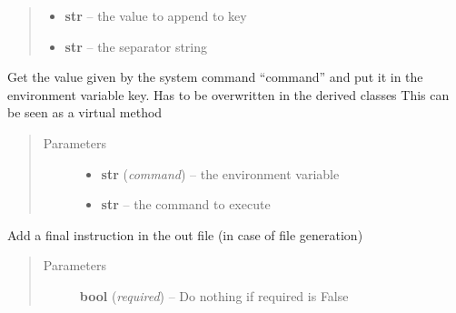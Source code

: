 \documentclass[a4paper,10pt,english]{sphinxmanual}
\begin{document}
\begin{fulllineitems}
\begin{fulllineitems}
\begin{quote}
\begin{description}
\begin{itemize}
\item {} 
\textbf{str} -- the value to append to key

\item {} 
\textbf{str} -- the separator string

\end{itemize}

\end{description}\end{quote}

\end{fulllineitems}


\begin{fulllineitems}
\label{commands/apidoc/src:src.fileEnviron.ContextFileEnviron.command_value}
Get the value given by the system command ``command'' 
and put it in the environment variable key.
Has to be overwritten in the derived classes
This can be seen as a virtual method
\begin{quote}\begin{description}
\item[{Parameters}] \leavevmode\begin{itemize}
\item {} 
\textbf{str} (\emph{command}) -- the environment variable

\item {} 
\textbf{str} -- the command to execute

\end{itemize}

\end{description}\end{quote}

\end{fulllineitems}


\begin{fulllineitems}
\label{commands/apidoc/src:src.fileEnviron.ContextFileEnviron.finish}
Add a final instruction in the out file (in case of file generation)
\begin{quote}\begin{description}
\item[{Parameters}] \leavevmode
\textbf{bool} (\emph{required}) -- Do nothing if required is False


\end{description}
\end{quote}
\end{fulllineitems}
\end{fulllineitems}
\end{document}
